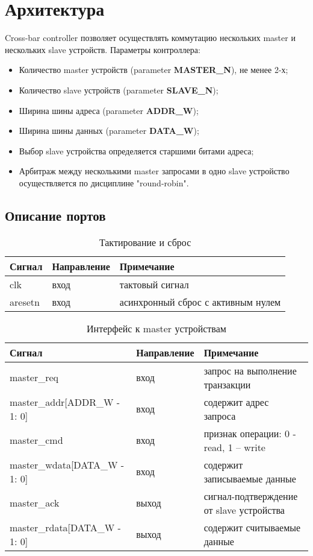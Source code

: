 \documentclass[a4paper, 10pt]{article}
\begin{document}
\newpage{}
\section{Архитектура}

Cross-bar controller позволяет осуществлять коммутацию нескольких master и нескольких slave устройств.
Параметры контроллера:
\begin{itemize}
 \item Количество master устройств (parameter \textbf{MASTER\_N}), не менее 2-х;
 \item Количество slave устройств (parameter \textbf{SLAVE\_N});
 \item Ширина шины адреса (parameter \textbf{ADDR\_W});
 \item Ширина шины данных (parameter \textbf{DATA\_W});
 \item Выбор slave устройства определяется старшими битами адреса;
 \item Арбитраж между несколькими master запросами в одно slave устройство осуществляется по дисциплине "round-robin".
\end{itemize}


\subsection{Описание портов}

\begin{table}[h!]
 \caption{Тактирование и сброс}
 \centering
  \begin{tabular}{lll}
   \hline
   Сигнал & Направление & Примечание\\
   \hline 
   clk     & вход & тактовый сигнал\\
   aresetn & вход & асинхронный сброс с активным нулем\\
   \hline 
  \end{tabular}
\end{table}

\begin{table}[h!]
 \caption{Интерфейс к master устройствам}
 \centering
  \begin{tabular}{lll}
   \hline
   Сигнал & Направление & Примечание\\
   \hline 
   master\_req                   & вход  & запрос на выполнение транзакции\\
   master\_addr[ADDR\_W - 1: 0]  & вход  & содержит адрес запроса\\
   master\_cmd                   & вход  & признак операции: 0 - read, 1 – write\\
   master\_wdata[DATA\_W - 1: 0] & вход  & содержит записываемые данные\\
   master\_ack                   & выход & сигнал-подтверждение от slave устройства\\
   master\_rdata[DATA\_W - 1: 0] & выход & содержит считываемые данные\\
   \hline 
  \end{tabular}
\end{table}
\end{document}
